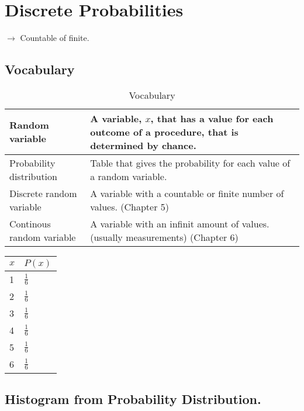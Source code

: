 \chapter{Discrete Probabilities}
$\to$ Countable of finite.

\section{Vocabulary}

 \begin{table}[htbp]
    \centering
    \begin{tabular}{l|p{8cm}}
        \toprule
        Random variable & A variable, $x$, that has a value for each outcome of a procedure, that is determined by chance. \\
        \midrule
        Probability distribution & Table that gives the probability for each value of a random variable. \\
        \midrule
        Discrete random variable & A variable with a countable or finite number of values. (Chapter 5)\\
        \midrule
        Continous random variable & A variable with an infinit amount of values. (usually measurements) (Chapter 6)\\
        \bottomrule
    \end{tabular}
    \caption{Vocabulary}
\end{table}

\begin{table}[htbp]
    \centering
    \begin{tabular}{l|l}
        \toprule
        $x$ & $P(x)$ \\
        \midrule
        1 & $\frac{1}{6}$ \\
        \midrule
        2 & $\frac{1}{6}$\\
        \midrule
        3 & $\frac{1}{6}$\\
        \midrule
        4 & $\frac{1}{6}$\\
        \midrule
        5 & $\frac{1}{6}$\\
        \midrule
        6 & $\frac{1}{6}$\\
        \bottomrule
    \end{tabular}
\end{table}

\vspace{50pt}

\section{Histogram from Probability Distribution.}

